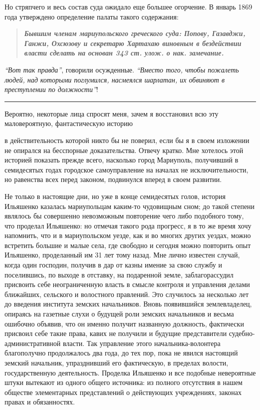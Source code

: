 \documentclass[a4paper,20pt]{article}
\begin{document}
Но стряпчего и весь состав суда ожидало еще большее огорчение. В январь 
1869 года утверждено определение
палаты такого содержания: 

\begin{quote}
\em\bfseries
Бывшим членам мариупольского
греческого суда: Попову, Газавджи, Ганжи, Охсюзову и
секретарю Хартахаю виновным в бездействии власти сделать на основан 343 ст. улож. о нак. замечание.
\end{quote}

\emph{``Вот так правда''}, говорили осужденные. \emph{``Вместо того, чтобы пожалеть людей, 
над которыми поглумился, насмеялся шарлатан, их обвиняют в преступлении по должности''}!

\par\noindent\rule{\textwidth}{0.4pt}

Вероятно, некоторые лица спросят меня, зачем я
восстановил всю эту маловероятную, фантастическую историю

в действительность которой никто бы не поверил, если бы я в своем изложении 
не опирался на бесспорные доказательства. Отвечу кратко. Мне хотелось этой историей
показать прежде всего, насколько город Мариуполь, получивший в 
семидесятых годах городское самоуправление
на началах не исключительности, но равенства всех перед законом, подвинулся вперед в своем развитии. 

Не только в настоящие дни, но уже в конце семидесятых голов, история Ильяшенко
казалась мариупольцам каким-то чудовищным сном; до такой степени являлось бы
совершенно невозможным повторение чего либо подобного тому, что проделал
Ильяшенко: но отмечая такого рода прогресс, я в то же время хочу напомнить, что
и в мариупольском уезде, как и во многих других уездах, можно встретить большие
и малые села, где свободно и сегодня можно повторить опыт Ильяшенко,
проделанный им 31 лет тому назад. Мне лично известен случай, когда
один господин, получив в дар от казны имение за
свою службу и поселившись, по выходе в отставку,
на подаренной земле, заблагорассудил присвоить себе неограниченную власть 
в смысле контроля и управления делами
ближайших, сельского и волостного правлений. Это случилось
за несколько лет до введения института земских начальников. 
Вновь появившийся землевладелец, опираясь на
газетные слухи о будущей роли земских начальников и
весьма ошибочно объявив, что он именно получит названную должность, 
фактически присвоил себе такие права,
кавих не получили и будущие представители судебно-административной
власти. Так управление этого начальника-волонтера 
благополучно продолжалось два года, до тех пор,
пока не явился настоящий земский начальник, упразднивший
его фактическую, в пределах волости, государственную деятельность.
Проделка Ильяшенко и все подобные невероятные штуки вытекают из одного общего источника:
из полного отсутствия в нашем обществе элементарных
представлений о действующих учреждениях, законах правах и обязанностях.
\end{document}
